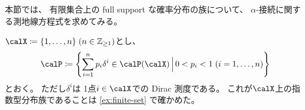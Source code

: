\documentclass[report]{jlreq}
\begin{document}
本節では、
有限集合上の full support な確率分布の族について、
$\alpha$-接続に関する測地線方程式を求めてみる。

\begin{settings}
    $\calX \coloneqq \{ 1, \dots, n \} \; (n \in \Z_{\ge 1})$とし、
    \begin{equation}
        \calP \coloneqq \mybrace{
            \sum_{i = 1}^n p_i \delta^i
            \in \calP(\calX)
            \, \Big| \,
            0 < p_i < 1 \; (i = 1, \dots, n)
        }
    \end{equation}
    とおく。
    ただし$\delta^i$は
    1点$i \in \calX$での Dirac 測度である。
    これが$\calX$上の指数型分布族であることは
    \cref{ex:finite-set}
    で確かめた。
\end{settings}
\end{document}
